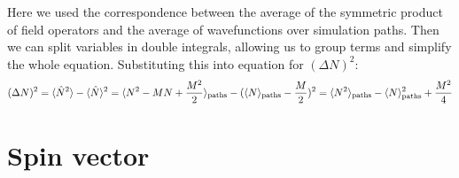 Here we used the correspondence between the average of the symmetric product of field operators and the average of wavefunctions over simulation paths.
Then we can split variables in double integrals, allowing us to group terms and simplify the whole equation.
Substituting this into equation for $(\Delta N)^2$:
\begin{equation}
\label{eqn:moments-calculation:delta-N}
	(\Delta N)^2
		= \langle \hat{N}^2 \rangle - \langle \hat{N} \rangle^2
		= \langle N^2 - M N + \frac{M^2}{2} \rangle_{\mathrm{paths}} - (\langle N \rangle_{\mathrm{paths}} - \frac{M}{2})^2
		= \langle N^2 \rangle_{\mathrm{paths}} - \langle N \rangle_{\mathrm{paths}}^2 + \frac{M^2}{4}
\end{equation}


\section{Spin vector}

